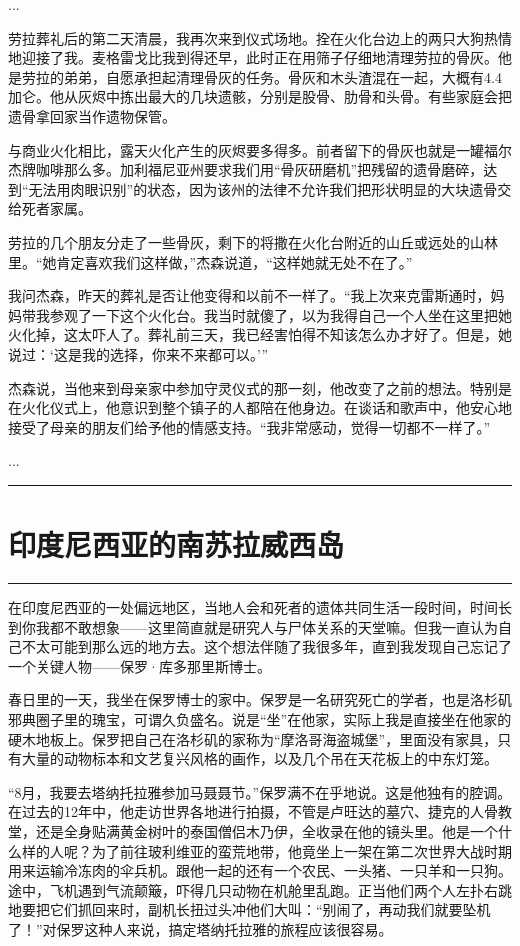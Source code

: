 \documentclass[12pt,oneside]{book}
\newcommand\hr{\par\noindent\hrule}
\begin{document}
...

劳拉葬礼后的第二天清晨，我再次来到仪式场地。拴在火化台边上的两只大狗热情地迎接了我。麦格雷戈比我到得还早，此时正在用筛子仔细地清理劳拉的骨灰。他是劳拉的弟弟，自愿承担起清理骨灰的任务。骨灰和木头渣混在一起，大概有4.4加仑。他从灰烬中拣出最大的几块遗骸，分别是股骨、肋骨和头骨。有些家庭会把遗骨拿回家当作遗物保管。

与商业火化相比，露天火化产生的灰烬要多得多。前者留下的骨灰也就是一罐福尔杰牌咖啡那么多。加利福尼亚州要求我们用“骨灰研磨机”把残留的遗骨磨碎，达到“无法用肉眼识别”的状态，因为该州的法律不允许我们把形状明显的大块遗骨交给死者家属。

劳拉的几个朋友分走了一些骨灰，剩下的将撒在火化台附近的山丘或远处的山林里。“她肯定喜欢我们这样做，”杰森说道，“这样她就无处不在了。”

我问杰森，昨天的葬礼是否让他变得和以前不一样了。“我上次来克雷斯通时，妈妈带我参观了一下这个火化台。我当时就傻了，以为我得自己一个人坐在这里把她火化掉，这太吓人了。葬礼前三天，我已经害怕得不知该怎么办才好了。但是，她说过：‘这是我的选择，你来不来都可以。’”

杰森说，当他来到母亲家中参加守灵仪式的那一刻，他改变了之前的想法。特别是在火化仪式上，他意识到整个镇子的人都陪在他身边。在谈话和歌声中，他安心地接受了母亲的朋友们给予他的情感支持。“我非常感动，觉得一切都不一样了。”

...

\hr

\section{印度尼西亚的南苏拉威西岛}
\hr 

在印度尼西亚的一处偏远地区，当地人会和死者的遗体共同生活一段时间，时间长到你我都不敢想象——这里简直就是研究人与尸体关系的天堂嘛。但我一直认为自己不太可能到那么远的地方去。这个想法伴随了我很多年，直到我发现自己忘记了一个关键人物——保罗·库多那里斯博士。

春日里的一天，我坐在保罗博士的家中。保罗是一名研究死亡的学者，也是洛杉矶邪典圈子里的瑰宝，可谓久负盛名。说是“坐”在他家，实际上我是直接坐在他家的硬木地板上。保罗把自己在洛杉矶的家称为“摩洛哥海盗城堡”，里面没有家具，只有大量的动物标本和文艺复兴风格的画作，以及几个吊在天花板上的中东灯笼。

“8月，我要去塔纳托拉雅参加马聂聂节。”保罗满不在乎地说。这是他独有的腔调。在过去的12年中，他走访世界各地进行拍摄，不管是卢旺达的墓穴、捷克的人骨教堂，还是全身贴满黄金树叶的泰国僧侣木乃伊，全收录在他的镜头里。他是一个什么样的人呢？为了前往玻利维亚的蛮荒地带，他竟坐上一架在第二次世界大战时期用来运输冷冻肉的伞兵机。跟他一起的还有一个农民、一头猪、一只羊和一只狗。途中，飞机遇到气流颠簸，吓得几只动物在机舱里乱跑。正当他们两个人左扑右跳地要把它们抓回来时，副机长扭过头冲他们大叫：“别闹了，再动我们就要坠机了！”对保罗这种人来说，搞定塔纳托拉雅的旅程应该很容易。
\end{document}
